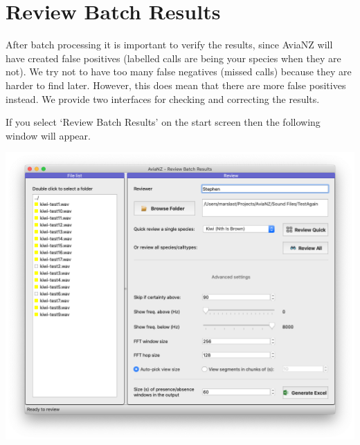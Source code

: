\documentclass{article}
\begin{document}
\section{Review Batch Results}\label{sec:review}

After batch processing it is important to verify the results, since AviaNZ will have created false positives (labelled calls are being your species when they are not). We try not to have too many false negatives (missed calls) because they are harder to find later. However, this does mean that there are more false positives instead. We provide two interfaces for checking and correcting the results. 

If you select `Review Batch Results' on the start screen then the following window will appear.

\begin{center}
	\includegraphics[width=.95\textwidth]{Figures/BatchReview1}
\end{center}
\end{document}

